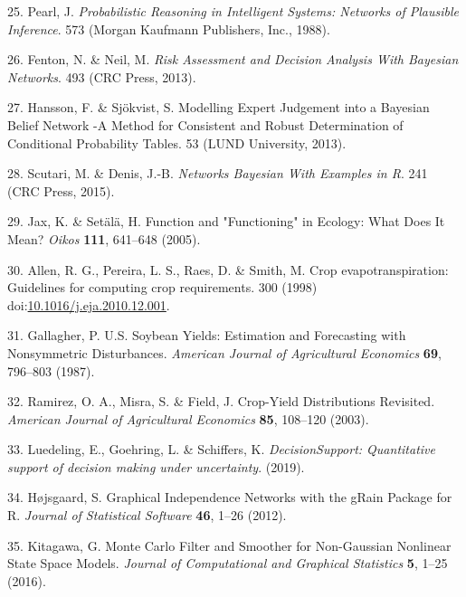 \documentclass[]{elsarticle} %
\begin{document}
\leavevmode\hypertarget{ref-Pearl_1988}{}%
25. Pearl, J. \emph{Probabilistic Reasoning in Intelligent Systems: Networks of Plausible Inference}. 573 (Morgan Kaufmann Publishers, Inc., 1988).

\leavevmode\hypertarget{ref-Fenton_and_Neil_2013}{}%
26. Fenton, N. \& Neil, M. \emph{Risk Assessment and Decision Analysis With Bayesian Networks}. 493 (CRC Press, 2013).

\leavevmode\hypertarget{ref-Hansson_and_Sjokvist_2013}{}%
27. Hansson, F. \& Sjökvist, S. Modelling Expert Judgement into a Bayesian Belief Network -A Method for Consistent and Robust Determination of Conditional Probability Tables. 53 (LUND University, 2013).

\leavevmode\hypertarget{ref-Scutari_and_Denis_2015}{}%
28. Scutari, M. \& Denis, J.-B. \emph{Networks Bayesian With Examples in R}. 241 (CRC Press, 2015).

\leavevmode\hypertarget{ref-Jax_and_Setala_2005}{}%
29. Jax, K. \& Setälä, H. Function and "Functioning" in Ecology: What Does It Mean? \emph{Oikos} \textbf{111}, 641--648 (2005).

\leavevmode\hypertarget{ref-Allen_et_al_1998}{}%
30. Allen, R. G., Pereira, L. S., Raes, D. \& Smith, M. Crop evapotranspiration: Guidelines for computing crop requirements. 300 (1998) doi:\href{https://doi.org/10.1016/j.eja.2010.12.001}{10.1016/j.eja.2010.12.001}.

\leavevmode\hypertarget{ref-Gallagher_1987}{}%
31. Gallagher, P. U.S. Soybean Yields: Estimation and Forecasting with Nonsymmetric Disturbances. \emph{American Journal of Agricultural Economics} \textbf{69}, 796--803 (1987).

\leavevmode\hypertarget{ref-Ramirez_et_al_2003}{}%
32. Ramirez, O. A., Misra, S. \& Field, J. Crop-Yield Distributions Revisited. \emph{American Journal of Agricultural Economics} \textbf{85}, 108--120 (2003).

\leavevmode\hypertarget{ref-Luedeling_Goehring_et_al_2019}{}%
33. Luedeling, E., Goehring, L. \& Schiffers, K. \emph{DecisionSupport: Quantitative support of decision making under uncertainty}. (2019).

\leavevmode\hypertarget{ref-Hojsgaard_2012}{}%
34. Højsgaard, S. Graphical Independence Networks with the gRain Package for R. \emph{Journal of Statistical Software} \textbf{46}, 1--26 (2012).

\leavevmode\hypertarget{ref-Kitagawa_2016}{}%
35. Kitagawa, G. Monte Carlo Filter and Smoother for Non-Gaussian Nonlinear State Space Models. \emph{Journal of Computational and Graphical Statistics} \textbf{5}, 1--25 (2016).
\end{document}
